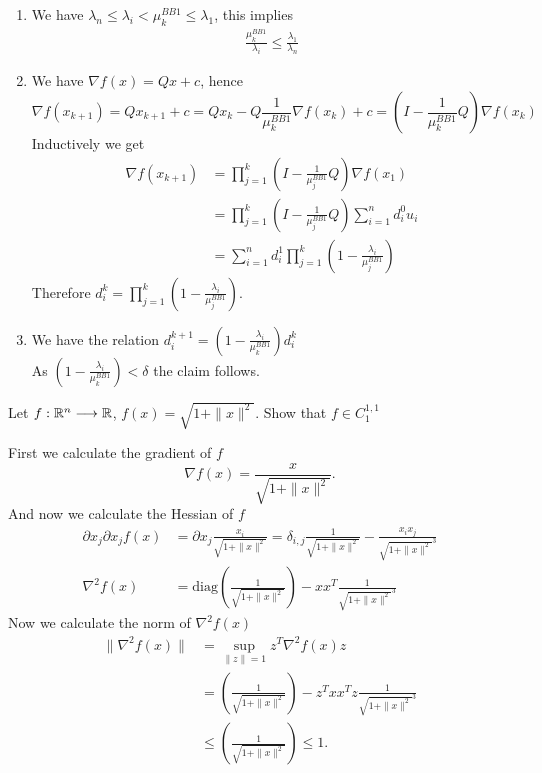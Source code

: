 \documentclass{ExerciseSheet}
\newif\ifsolutions
\begin{document}
\begin{solution}
\begin{enumerate}
    \item We have $\lambda_n \leq \lambda_i < \mu_k^{BB1}\leq \lambda_1$, this implies
    \begin{align*}
        \frac{\mu_k^{BB1}}{\lambda_i} \leq \frac{\lambda_1}{\lambda_n}
    \end{align*}
    \item We have $\nabla f(x)= Qx + c$, hence $$\nabla f(x_{k+1}) = Q x_{k+1}+ c = Q x_k - Q \frac{1}{\mu_k^{BB1}} \nabla f(x_k) + c = (I - \frac{1}{\mu_k^{BB1}}Q)\nabla f(x_k)$$
    Inductively we get
    \begin{align*}
        \nabla f(x_{k+1})&=\prod_{j=1}^k (I-\frac{1}{\mu_j^{BB1}}Q) \nabla f(x_1) \\
        &=\prod_{j=1}^k (I-\frac{1}{\mu_j^{BB1}}Q)\sum_{i=1}^n d_i^0 u_i \\
        &= \sum_{i=1}^n d_i^1 \prod_{j=1}^k (1-\frac{\lambda_i}{\mu_j^{BB1}})
    \end{align*}
    Therefore $d_i^k = \prod_{j=1}^k (1-\frac{\lambda_i}{\mu_j^{BB1}}) $.
    \item We have the relation 
    $d_i^{k+1}=(1-\frac{\lambda_i}{\mu_k^{BB1}})d_i^k$\\
    As $(1-\frac{\lambda_i}{\mu_k^{BB1}})<\delta$ the claim follows. 
\end{enumerate}
   
\end{solution}

\fi


\vskip 0.5cm

\begin{exo}
Let $f:\mathbb{R}^n \longrightarrow \mathbb{R}$, $f(x)=\sqrt{1+\|x\|^2}$. Show that $f\in C^{1,1}_1$
\end{exo}

\ifsolutions
\vskip 0.3cm
\begin{solution}
First we calculate the gradient of $f$
\begin{equation*}
    \nabla f(x) = \frac{x}{\sqrt{1+\|x\|^2}}.
\end{equation*}
And now we calculate the Hessian of $f$
\begin{align*}
   \partial x_j \partial x_j f(x) &= \partial x_j \frac{x_i}{\sqrt{1+\|x\|^2}} = \delta_{i,j} \frac{1}{\sqrt{1+\|x\|^2}} - \frac{x_ix_j}{\sqrt{1+\|x\|^2}^3} \\
   \nabla^2 f(x) &= \text{diag}(\frac{1}{\sqrt{1+\|x\|^2}}) - xx^T \frac{1}{\sqrt{1+\|x\|^2}^3}
\end{align*}
Now we calculate the norm of $\nabla^2 f(x)$
\begin{align*}
    \|\nabla^2 f(x)\| &= \sup_{\|z\|=1} z^T\nabla^2 f(x) z \\
    &= (\frac{1}{\sqrt{1+\|x\|^2}}) - z^Txx^Tz \frac{1}{\sqrt{1+\|x\|^2}^3} \\
    &\leq (\frac{1}{\sqrt{1+\|x\|^2}})  \leq 1. 
\end{align*}
\end{solution}
\end{document}
